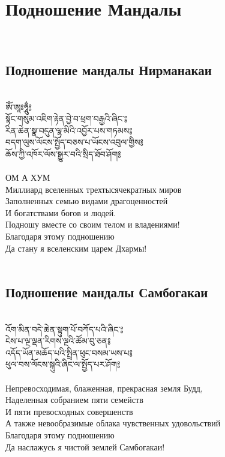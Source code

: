 \section{Подношение Мандалы}
\\
\subsection{Подношение мандалы Нирманакаи}
\\
\ti
ཨོཾ་ཨཱཿཧཱུྂ༔ \\
སྟོང་གསུམ་འཇིག་རྟེན་བྱེ་བ་ཕྲག་བརྒྱའི་ཞིང་༔\\
རིན་ཆེན་སྣ་བདུན་ལྷ་མིའི་འབྱོར་པས་གཏམས༔ \\
བདག་ལུས་ལོངས་སྤྱོད་བཅས་པ་ཡོངས་འབུལ་གྱིས༔ \\
ཆོས་ཀྱི་འཁོར་ལོས་སྒྱུར་བའི་སྲིད་ཐོབ་ཤོག༔ \\
\\
\ru
ОМ А ХУМ\\
Миллиард вселенных трехтысячекратных миров\\
Заполненных семью видами драгоценностей\\
И богатствами богов и людей.\\
Подношу вместе со своим телом и владениями!\\
Благодаря этому подношению\\
Да стану я вселенским царем Дхармы!\\
\\
\subsection{Подношение мандалы Самбогакаи}
\\
\ti
འོག་མིན་བདེ་ཆེན་སྟུག་པོ་བཀོད་པའི་ཞིང་༔ \\
ངེས་པ་ལྔ་ལྡན་རིགས་ལྔའི་ཚོམ་བུ་ཅན༔  \\
འདོད་ཡོན་མཆོད་པའི་སྤྲིན་ཕུང་བསམ་ཡས་པ༔ \\
ཕུལ་བས་ལོངས་སྐུའི་ཞིང་ལ་སྤྱོད་པར་ཤོག༔ \\
\\
\ru
Непревосходимая, блаженная, прекрасная земля Будд,\\
Наделенная собранием пяти семейств\\
И пяти превосходных совершенств\\
А также невообразимые облака чувственных удовольствий\\
Благодаря этому подношению\\
Да наслажусь я чистой землей Самбогакаи!\\

